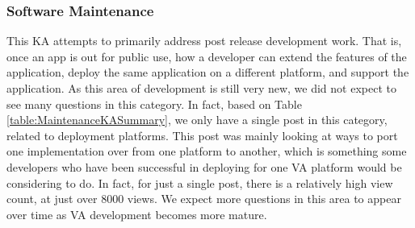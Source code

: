 \documentclass{sigchi}
\begin{document}
\subsubsection{Software Maintenance}
\begin{table}[H] %
\centering
\caption{Summary of subcategories and their accompanying demographic information for the Maintenance SWEBOK KA}
\label{table:MaintenanceKASummary}
\end{table}
This KA attempts to primarily address post release development work. That is, once an app is out for public use, how a developer can extend the features of the application, deploy the same application on a different platform, and support the application. As this area of development is still very new, we did not expect to see many questions in this category. In fact, based on Table \ref{table:MaintenanceKASummary}, we only have a single post in this category, related to deployment platforms. This post was mainly looking at ways to port one implementation over from one platform to another, which is something some developers who have been successful in deploying for one VA platform would be considering to do. In fact, for just a single post, there is a relatively high view count, at just over 8000 views. We expect more questions in this area to appear over time as VA development becomes more mature.
\end{document}

